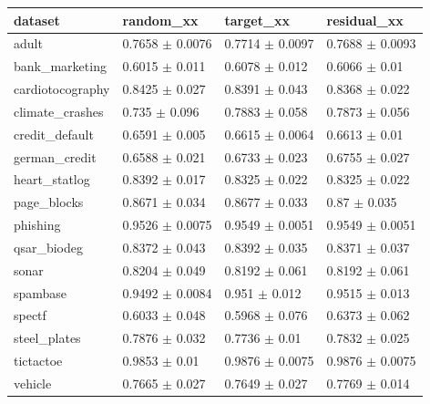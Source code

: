\begin{tabular}{llll}
\toprule
dataset & random\_xx & target\_xx & residual\_xx \\
\midrule
adult & 0.7658 $\pm$ 0.0076 & 0.7714 $\pm$ 0.0097 & 0.7688 $\pm$ 0.0093 \\
bank\_marketing & 0.6015 $\pm$ 0.011 & 0.6078 $\pm$ 0.012 & 0.6066 $\pm$ 0.01 \\
cardiotocography & 0.8425 $\pm$ 0.027 & 0.8391 $\pm$ 0.043 & 0.8368 $\pm$ 0.022 \\
climate\_crashes & 0.735 $\pm$ 0.096 & 0.7883 $\pm$ 0.058 & 0.7873 $\pm$ 0.056 \\
credit\_default & 0.6591 $\pm$ 0.005 & 0.6615 $\pm$ 0.0064 & 0.6613 $\pm$ 0.01 \\
german\_credit & 0.6588 $\pm$ 0.021 & 0.6733 $\pm$ 0.023 & 0.6755 $\pm$ 0.027 \\
heart\_statlog & 0.8392 $\pm$ 0.017 & 0.8325 $\pm$ 0.022 & 0.8325 $\pm$ 0.022 \\
page\_blocks & 0.8671 $\pm$ 0.034 & 0.8677 $\pm$ 0.033 & 0.87 $\pm$ 0.035 \\
phishing & 0.9526 $\pm$ 0.0075 & 0.9549 $\pm$ 0.0051 & 0.9549 $\pm$ 0.0051 \\
qsar\_biodeg & 0.8372 $\pm$ 0.043 & 0.8392 $\pm$ 0.035 & 0.8371 $\pm$ 0.037 \\
sonar & 0.8204 $\pm$ 0.049 & 0.8192 $\pm$ 0.061 & 0.8192 $\pm$ 0.061 \\
spambase & 0.9492 $\pm$ 0.0084 & 0.951 $\pm$ 0.012 & 0.9515 $\pm$ 0.013 \\
spectf & 0.6033 $\pm$ 0.048 & 0.5968 $\pm$ 0.076 & 0.6373 $\pm$ 0.062 \\
steel\_plates & 0.7876 $\pm$ 0.032 & 0.7736 $\pm$ 0.01 & 0.7832 $\pm$ 0.025 \\
tictactoe & 0.9853 $\pm$ 0.01 & 0.9876 $\pm$ 0.0075 & 0.9876 $\pm$ 0.0075 \\
vehicle & 0.7665 $\pm$ 0.027 & 0.7649 $\pm$ 0.027 & 0.7769 $\pm$ 0.014 \\
\bottomrule
\end{tabular}
